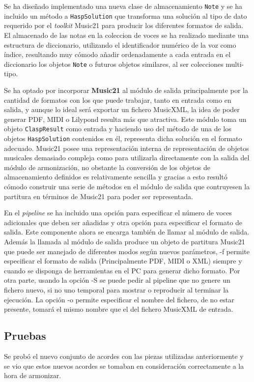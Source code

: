 Se ha diseñado implementado una nueva clase de almacenamiento \texttt{Note} y se ha incluido un método a \texttt{HaspSolution} que transforma una solución al tipo de dato requerido por el \textit{toolkit} Music21 para producir los diferentes formatos de salida. El almacenado de las notas en la coleccion de voces se ha realizado mediante una estructura de diccionario, utilizando el identificador numérico de la voz como índice, resultando muy cómodo añadir ordenadamente a cada entrada en el diccionario los objetos \texttt{Note} o futuros objetos similares, al ser colecciones multi-tipo.

Se ha optado por incorporar \textbf{Music21} al módulo de salida principalmente por la cantidad de formatos con los que puede trabajar, tanto en entrada como en salida, y aunque lo ideal será exportar un fichero MusicXML, la idea de poder generar PDF, MIDI o Lilypond resulta más que atractiva. Este módulo toma un objeto \texttt{ClaspResult} como entrada y haciendo uso del método de una de los objetos \texttt{HaspSolution} contenidos en él, representa dicha solución en el formato adecuado. Music21 posee una representación interna de representación de objetos musicales demasiado compleja como para utilizarla directamente con la salida del módulo de armonización, no obstante la conversión de los objetos de almacenamiento definidos es relativamente sencilla y gracias a esto resultó cómodo construir una serie de métodos en el módulo de salida que contruyesen la partitura en términos de Music21 para poder ser representada. 

En el \textit{pipeline} se ha incluido una opción para especificar el número de voces adicionales que deben ser añadidas y otra opción para especificar el formato de salida. Este componente ahora se encarga también de llamar al módulo de salida.
Además la llamada al módulo de salida produce un objeto de partitura Music21 que puede ser manejado de diferentes modos según nuevos parámetros, -f permite especificar el formato de salida (Principalmente PDF, MIDI o XML) siempre y cuando se disponga de herramientas en el PC para generar dicho formato. Por otra parte, usando la opción -S se puede pedir al pipeline que no genere un fichero nuevo, si no uno temporal para mostrar o reproducir al terminar la ejecución. La opción -o permite especificar el nombre del fichero, de no estar presente, tomará el mismo nombre que el del fichero MusicXML de entrada.

\subsection{Pruebas}
Se probó el nuevo conjunto de acordes con las piezas utilizadas anteriormente y se vio que estos nuevos acordes se tomaban en consideración correctamente a la hora de armonizar.

